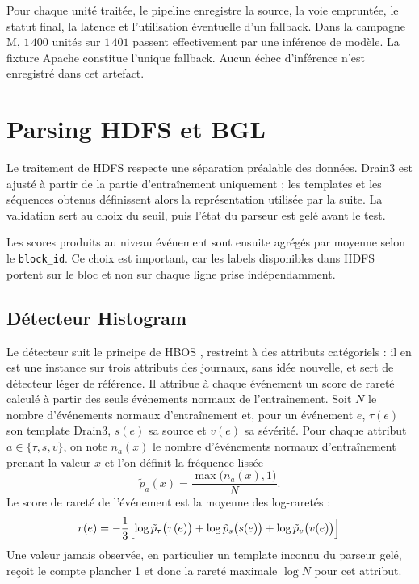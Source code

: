 Pour chaque unité traitée, le pipeline enregistre la source, la voie empruntée, le statut final, la latence et l'utilisation éventuelle d'un fallback. Dans la campagne M, $1\,400$ unités sur $1\,401$ passent effectivement par une inférence de modèle. La fixture Apache constitue l'unique fallback. Aucun échec d'inférence n'est enregistré dans cet artefact.


\section{Parsing HDFS et BGL}

Le traitement de HDFS respecte une séparation préalable des données. Drain3 est ajusté à partir de la partie d'entraînement uniquement ; les templates et les séquences obtenus définissent alors la représentation utilisée par la suite. La validation sert au choix du seuil, puis l'état du parseur est gelé avant le test.

Les scores produits au niveau événement sont ensuite agrégés par moyenne selon le \texttt{block\_id}. Ce choix est important, car les labels disponibles dans HDFS portent sur le bloc et non sur chaque ligne prise indépendamment.

\subsection{Détecteur Histogram}
\label{subsec:histogram}

Le détecteur suit le principe de HBOS \cite{goldstein2012hbos}, restreint à des attributs catégoriels : il en est une instance sur trois attributs des journaux, sans idée nouvelle, et sert de détecteur léger de référence. Il attribue à chaque événement un score de rareté calculé à partir des seuls événements normaux de l'entraînement. Soit $N$ le nombre d'événements normaux d'entraînement et, pour un événement $e$, $\tau(e)$ son template Drain3, $s(e)$ sa source et $v(e)$ sa sévérité. Pour chaque attribut $a \in \{\tau, s, v\}$, on note $n_a(x)$ le nombre d'événements normaux d'entraînement prenant la valeur $x$ et l'on définit la fréquence lissée
\[
  \tilde{p}_a(x) = \frac{\max\bigl(n_a(x), 1\bigr)}{N}.
\]
Le score de rareté de l'événement est la moyenne des log-raretés :
\[
  r(e) = -\frac{1}{3}\Bigl[\log \tilde{p}_\tau\bigl(\tau(e)\bigr) + \log \tilde{p}_s\bigl(s(e)\bigr) + \log \tilde{p}_v\bigl(v(e)\bigr)\Bigr].
\]
Une valeur jamais observée, en particulier un template inconnu du parseur gelé, reçoit le compte plancher 1 et donc la rareté maximale $\log N$ pour cet attribut.


